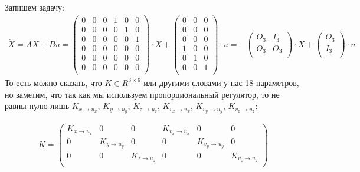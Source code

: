 \documentclass[a4paper,12pt]{article}
\begin{document}
Запишем задачу:
\begin{align*}
    \Dot{X} = AX + Bu =
            \begin{pmatrix}
                0& 0& 0& 1& 0& 0\\
                0& 0& 0& 0& 1& 0\\
                0& 0& 0& 0& 0& 1\\
                0& 0& 0& 0& 0& 0\\
                0& 0& 0& 0& 0& 0\\
                0& 0& 0& 0& 0& 0\\
            \end{pmatrix} 
            \cdot X +
            \begin{pmatrix}
                0& 0& 0\\
                0& 0& 0\\
                0& 0& 0\\
                1& 0& 0\\
                0& 1& 0\\
                0& 0& 1\\
            \end{pmatrix}
            \cdot u = 
            &\begin{pmatrix}
                O_3& I_3\\
                O_3& O_3\\ 
            \end{pmatrix}
            \cdot X +
            \begin{pmatrix}
                O_3\\
                I_3\\
            \end{pmatrix}
            \cdot u
\end{align*}
То есть можно сказать, что $K\in R^{3\times 6}$ или другими словами у нас 18 параметров, но заметим, что так как мы используем пропорциональный регулятор, то не равны нулю лишь $K_{x\rightarrow u_x}$, $K_{y\rightarrow u_y}$, $K_{z\rightarrow u_z}$, $K_{v_x\rightarrow u_x}$, $K_{v_y\rightarrow u_y}$, $K_{v_z\rightarrow u_z}$:

\begin{align*}
K =
\begin{pmatrix}
    K_{x\rightarrow u_x}& 0& 0& K_{v_x\rightarrow u_x} & 0& 0\\
    0& K_{y\rightarrow u_y} & 0& 0& K_{v_y\rightarrow u_y} & 0\\
    0& 0& K_{z\rightarrow u_z} & 0& 0& K_{v_z\rightarrow u_z} \\
\end{pmatrix}
\end{align*}
\end{document}
